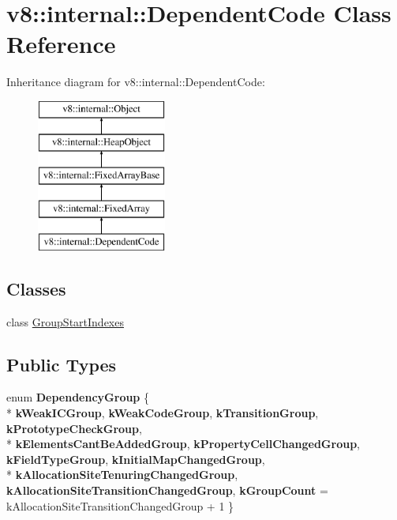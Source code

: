 \hypertarget{classv8_1_1internal_1_1_dependent_code}{}\section{v8\+:\+:internal\+:\+:Dependent\+Code Class Reference}
\label{classv8_1_1internal_1_1_dependent_code}
Inheritance diagram for v8\+:\+:internal\+:\+:Dependent\+Code\+:\begin{figure}[H]
\begin{center}
\leavevmode
\includegraphics[height=5.000000cm]{classv8_1_1internal_1_1_dependent_code}
\end{center}
\end{figure}
\subsection*{Classes}
\begin{DoxyCompactItemize}
\item 
class \hyperlink{classv8_1_1internal_1_1_dependent_code_1_1_group_start_indexes}{Group\+Start\+Indexes}
\end{DoxyCompactItemize}
\subsection*{Public Types}
\begin{DoxyCompactItemize}
\item 
\hypertarget{classv8_1_1internal_1_1_dependent_code_a6ddeb27b4e6f458ce2257036e3f364ae}{}enum {\bfseries Dependency\+Group} \{ \\*
{\bfseries k\+Weak\+I\+C\+Group}, 
{\bfseries k\+Weak\+Code\+Group}, 
{\bfseries k\+Transition\+Group}, 
{\bfseries k\+Prototype\+Check\+Group}, 
\\*
{\bfseries k\+Elements\+Cant\+Be\+Added\+Group}, 
{\bfseries k\+Property\+Cell\+Changed\+Group}, 
{\bfseries k\+Field\+Type\+Group}, 
{\bfseries k\+Initial\+Map\+Changed\+Group}, 
\\*
{\bfseries k\+Allocation\+Site\+Tenuring\+Changed\+Group}, 
{\bfseries k\+Allocation\+Site\+Transition\+Changed\+Group}, 
{\bfseries k\+Group\+Count} = k\+Allocation\+Site\+Transition\+Changed\+Group + 1
 \}\label{classv8_1_1internal_1_1_dependent_code_a6ddeb27b4e6f458ce2257036e3f364ae}

\end{DoxyCompactItemize}
